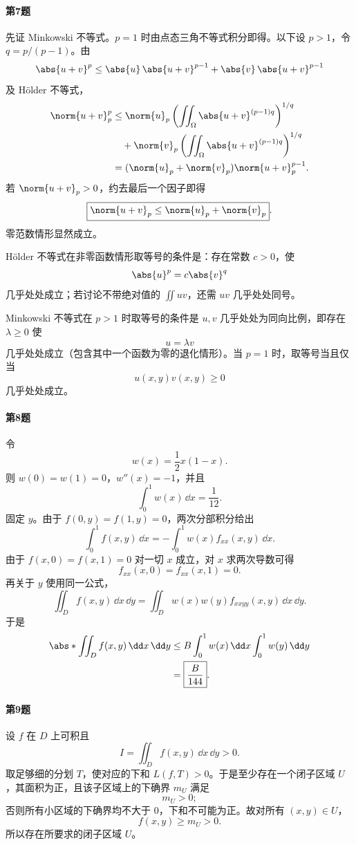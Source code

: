 \paragraph{第7题}
\begin{xsolution}
先证 Minkowski 不等式。$p=1$ 时由点态三角不等式积分即得。以下设 $p>1$，令 $q=p/(p-1)$。由
\[
  \abs{u+v}^p\le\abs{u}\,\abs{u+v}^{p-1}
  +\abs{v}\,\abs{u+v}^{p-1}
\]
及 Hölder 不等式，
\begin{align*}
  \norm{u+v}_p^p
  &\le \norm{u}_p
  \left(\iint_\Omega\abs{u+v}^{(p-1)q}\right)^{1/q}\\
  &\quad+\norm{v}_p
  \left(\iint_\Omega\abs{u+v}^{(p-1)q}\right)^{1/q}\\
  &=(\norm{u}_p+\norm{v}_p)\norm{u+v}_p^{p-1}.
\end{align*}
若 $\norm{u+v}_p>0$，约去最后一个因子即得
\[
  \boxed{\norm{u+v}_p\le\norm{u}_p+\norm{v}_p}.
\]
零范数情形显然成立。

Hölder 不等式在非零函数情形取等号的条件是：存在常数 $c>0$，使
\[
  \abs{u}^p=c\abs{v}^q
\]
几乎处处成立；若讨论不带绝对值的 $\iint uv$，还需 $uv$ 几乎处处同号。

Minkowski 不等式在 $p>1$ 时取等号的条件是 $u,v$ 几乎处处为同向比例，即存在 $\lambda\ge0$ 使
\[
  u=\lambda v
\]
几乎处处成立（包含其中一个函数为零的退化情形）。当 $p=1$ 时，取等号当且仅当
\[
  u(x,y)v(x,y)\ge0
\]
几乎处处成立。
\end{xsolution}

\paragraph{第8题}
\begin{xsolution}
令
\[
  w(x)=\frac12x(1-x).
\]
则 $w(0)=w(1)=0$，$w''(x)=-1$，并且
\[
  \int_0^1w(x)\,\dd x=\frac1{12}.
\]
固定 $y$。由于 $f(0,y)=f(1,y)=0$，两次分部积分给出
\[
  \int_0^1f(x,y)\,\dd x
  =-\int_0^1w(x)f_{xx}(x,y)\,\dd x.
\]
由于 $f(x,0)=f(x,1)=0$ 对一切 $x$ 成立，对 $x$ 求两次导数可得
\[
  f_{xx}(x,0)=f_{xx}(x,1)=0.
\]
再关于 $y$ 使用同一公式，
\[
  \iint_Df(x,y)\,\dd x\,\dd y
  =\iint_Dw(x)w(y)f_{xxyy}(x,y)\,\dd x\,\dd y.
\]
于是
\begin{align*}
 \abs*{\iint_Df(x,y)\,\dd x\,\dd y}
 &\le B\int_0^1w(x)\,\dd x\int_0^1w(y)\,\dd y\\
 &=\boxed{\frac{B}{144}}.
\end{align*}
\end{xsolution}

\paragraph{第9题}
\begin{xsolution}
设 $f$ 在 $D$ 上可积且
\[
  I=\iint_Df(x,y)\,\dd x\,\dd y>0.
\]
取足够细的分划 $T$，使对应的下和 $L(f,T)>0$。于是至少存在一个闭子区域 $U$，其面积为正，且该子区域上的下确界 $m_U$ 满足
\[
  m_U>0;
\]
否则所有小区域的下确界均不大于 $0$，下和不可能为正。故对所有 $(x,y)\in U$，
\[
  f(x,y)\ge m_U>0.
\]
所以存在所要求的闭子区域 $U$。
\end{xsolution}

